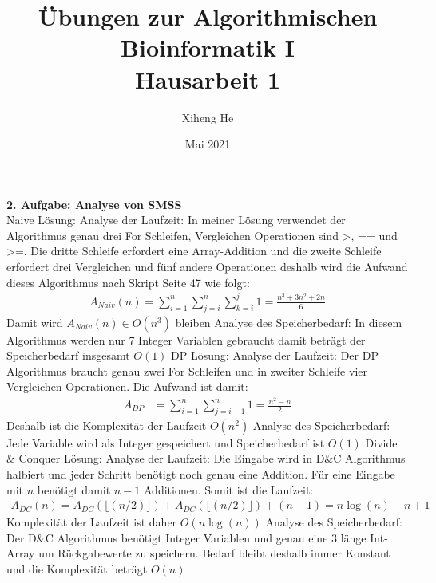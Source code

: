 \documentclass{article}
\title{Übungen zur Algorithmischen Bioinformatik I\\
Hausarbeit 1}
\author{Xiheng He }
\date{Mai 2021}
\begin{document}
\maketitle
\begin{flushleft}
\textbf{2. Aufgabe: Analyse von SMSS}\\
Naive Lösung:
\newline
Analyse der Laufzeit: In meiner Lösung verwendet der Algorithmus genau drei For Schleifen, Vergleichen Operationen sind >, == und >=.
Die dritte Schleife erfordert eine Array-Addition und die zweite Schleife erfordert drei Vergleichen und fünf andere Operationen deshalb wird die Aufwand dieses Algorithmus
nach Skript Seite 47 wie folgt:
\begin{align*}
    A_{Naiv}(n) = \sum_{i = 1}^{n} \sum_{j = i}^{n} \sum_{k = i}^{j} 1 = \frac{n^3 + 3n^2 + 2n}{6}   
\end{align*}
Damit wird $A_{Naiv}(n) \in O(n^3)$ bleiben
\newline
Analyse des Speicherbedarf: In diesem Algorithmus werden nur 7 Integer Variablen gebraucht damit beträgt der Speicherbedarf insgesamt $O(1)$
\newline
DP Lösung: 
\newline
Analyse der Laufzeit: Der DP Algorithmus braucht genau zwei For Schleifen und in zweiter Schleife vier Vergleichen Operationen. Die Aufwand ist damit:
\begin{align*}
    A_{DP} &= \sum_{i = 1}^{n} \sum_{j = i + 1}^{n} 1 = \frac{n^2 - n}{2}
\end{align*}
Deshalb ist die Komplexität der Laufzeit $O(n^2)$
\newline
Analyse des Speicherbedarf: Jede Variable wird als Integer gespeichert und Speicherbedarf ist $O(1)$
\newline
Divide \& Conquer Lösung: 
\newline
Analyse der Laufzeit: Die Eingabe wird in D\&C Algorithmus halbiert und jeder Schritt benötigt noch genau eine Addition. 
Für eine Eingabe mit $n$ benötigt damit $n-1$ Additionen. Somit ist die Laufzeit:
\begin{align*}
    A_{DC}(n) = A_{DC}(\lfloor(n/2)\rfloor) + A_{DC}(\lfloor(n/2)\rfloor) + (n-1) = n\log(n) - n + 1
\end{align*}
Komplexität der Laufzeit ist daher $O(n\log(n))$
\newline
Analyse des Speicherbedarf: Der D\&C Algorithmus benötigt Integer Variablen und 
genau eine 3 länge Int-Array um Rückgabewerte zu speichern. Bedarf bleibt deshalb immer Konstant und die Komplexität beträgt $O(n)$

\end{flushleft}
\end{document}
